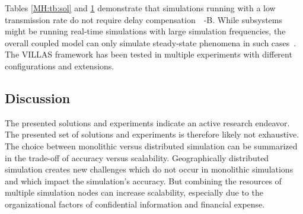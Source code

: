 \documentclass[a4paper]{atseminar}
\begin{document}
\begin{table}[h]
{\begin{tabular}{ll|llllllll}


\end{tabular}
\label{MH:tb:exp}
}%
\end{table}

Tables \ref{MH:tb:sol} and \ref{MH:tb:exp} demonstrate that simulations running with a low transmission rate do not require delay compensation~\cite{palmintier2015, lundstrom2017}~\cite{pellegrino2020}-B. While subsystems might be running real-time simulations with large simulation frequencies, the overall coupled model can only simulate steady-state phenomena in such cases~\cite{palmintier2015}. The VILLAS framework has been tested in multiple experiments with different configurations and extensions.


\subsection{Discussion}
\label{MH:sec:discuss}


The presented solutions and experiments indicate an active research endeavor. The presented set of solutions and experiments is therefore likely not exhaustive.
The choice between monolithic versus distributed simulation can be summarized in the trade-off of accuracy versus scalability.
Geographically distributed simulation creates new challenges which do not occur in monolithic simulations and which impact the simulation's accuracy. But combining the resources of multiple simulation nodes can increase scalability, especially due to the organizational factors of confidential information and financial expense.
\end{document}

